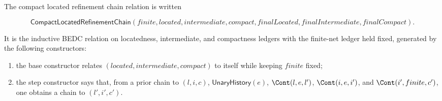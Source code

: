 \begin{definition}
\label{def:compact-located-refinement-chain}
The compact located refinement chain relation is written

$$
\mathsf{CompactLocatedRefinementChain}(finite,located,intermediate,compact,finalLocated,finalIntermediate,finalCompact).
$$

It is the inductive BEDC relation on locatedness, intermediate, and compactness
ledgers with the finite-net ledger held fixed, generated by the following
constructors:
\begin{enumerate}
  \item the base constructor relates $(located,intermediate,compact)$ to itself
  while keeping $finite$ fixed;
  \item the step constructor says that, from a prior chain to $(l,i,c)$,
  $\mathsf{UnaryHistory}(e)$, $\Cont(l,e,l')$, $\Cont(i,e,i')$, and
  $\Cont(i',finite,c')$, one obtains a chain to $(l',i',c')$.
\end{enumerate}
\end{definition}


